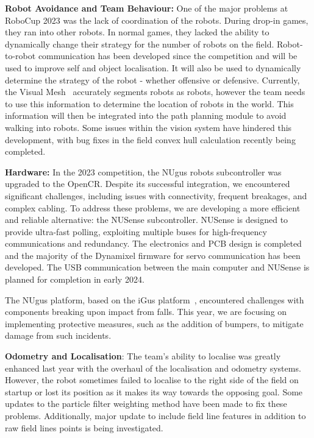 \documentclass{llncs}
\begin{document}
\noindent\textbf{Robot Avoidance and Team Behaviour:}
One of the major problems at RoboCup 2023 was the lack of coordination of the robots. During drop-in games, they ran into other robots. In normal games, they lacked the ability to dynamically change their strategy for the number of robots on the field.
Robot-to-robot communication has been developed since the competition and will be used to improve self and object localisation. It will also be used to dynamically determine the strategy of the robot - whether offensive or defensive. Currently, the Visual Mesh~\cite{Houliston2018VisualMR} accurately segments robots as robots, however the team needs to use this information to determine the location of robots in the world. This information will then be integrated into the path planning module to avoid walking into robots. Some issues within the vision system have hindered this development, with bug fixes in the field convex hull calculation recently being completed. \newline

\noindent\textbf{Hardware:}
In the 2023 competition, the NUgus robots subcontroller was upgraded to the OpenCR. Despite its successful integration, we encountered significant challenges, including issues with connectivity, frequent breakages, and complex cabling. To address these problems, we are developing a more efficient and reliable alternative: the NUSense subcontroller. NUSense is designed to provide ultra-fast polling, exploiting multiple buses for high-frequency communications and redundancy. The electronics and PCB design is completed and the majority of the Dynamixel firmware for servo communication has been developed. The USB communication between the main computer and NUSense is planned for completion in early 2024.

The NUgus platform, based on the iGus platform~\cite{Nimbro2018TDP}, encountered challenges with components breaking upon impact from falls. This year, we are focusing on implementing protective measures, such as the addition of bumpers, to mitigate damage from such incidents.

\noindent\textbf{Odometry and Localisation}:
The team's ability to localise was greatly enhanced last year with the overhaul of the localisation and odometry systems. However, the robot sometimes failed to localise to the right side of the field on startup or lost its position as it makes its way towards the opposing goal. Some updates to the particle filter weighting method have been made to fix these problems. Additionally, major update to include field line features in addition to raw field lines points is being investigated.\newline
\end{document}
